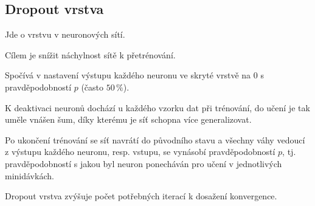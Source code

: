 \subsection{Dropout vrstva}

\begin{compactitem}
    \item Jde o vrstvu v neuronových sítí.

    \item Cílem je snížit náchylnost sítě k přetrénování.

    \item Spočívá v nastavení výstupu každého neuronu ve skryté vrstvě na $0$ s pravděpodobností $p$ (často $50\,\%$).

    \item K deaktivaci neuronů dochází u každého vzorku dat při trénování, do učení je tak uměle vnášen šum, díky kterému je síť schopna více generalizovat.

    \item Po ukončení trénování se síť navrátí do původního stavu a všechny váhy vedoucí z výstupu každého neuronu, resp. vstupu, se vynásobí pravděpodobností $p$, tj. pravděpodobností s jakou byl neuron ponecháván pro učení v jednotlivých minidávkách.

    \item Dropout vrstva zvýšuje počet potřebných iterací k dosažení konvergence.
\end{compactitem}
